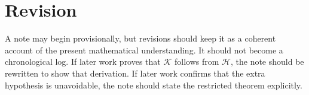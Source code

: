 \documentclass{article}
\begin{document}
\section{Revision}

A note may begin provisionally, but revisions should keep it as a coherent
account of the present mathematical understanding. It should not become a
chronological log. If later work proves that $\mathcal K$ follows from
$\mathcal H$, the note should be rewritten to show that derivation. If later
work confirms that the extra hypothesis is unavoidable, the note should state
the restricted theorem explicitly.



\end{document}
